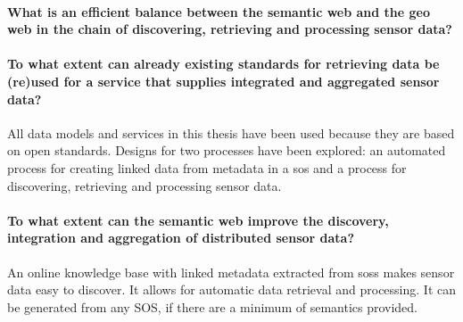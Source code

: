 
\paragraph{What is an efficient balance between the semantic web and the geo web in the chain of discovering, retrieving and processing sensor data?}\mbox{}



\paragraph{To what extent can already existing standards for retrieving data be (re)used for
	a service that supplies integrated and aggregated sensor data?}\mbox{}

All data models and services in this thesis have been used because they are based on open standards. Designs for two processes have been explored: an automated process for creating linked data from metadata in a \ac{sos} and a process for discovering, retrieving and processing sensor data.


\paragraph{To what extent can the semantic web improve the discovery, integration and aggregation of distributed sensor data?}\mbox{}

An online knowledge base with linked metadata extracted from \aclp{sos} makes sensor data easy to discover. It allows for automatic data retrieval and processing. It can be generated from any SOS, if there are a minimum of semantics provided. 
